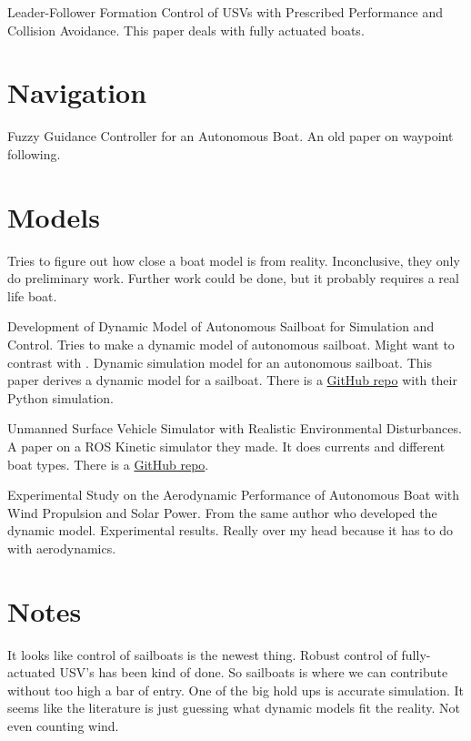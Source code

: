 \documentclass[conference]{IEEEtran}
\begin{document}
\cite{Dai2017} Leader-Follower Formation Control of USVs with Prescribed Performance and Collision Avoidance. This paper deals with fully actuated boats.


\section{Navigation}
\cite{Vaneck1997} Fuzzy Guidance Controller for an Autonomous Boat. An old paper on waypoint following.


\section{Models}
\cite{Huang2017} Tries to figure out how close a boat model is from reality. Inconclusive, they only do preliminary work. Further work could be done, but it probably requires a real life boat.

\cite{Setiawan2020} Development of Dynamic Model of Autonomous Sailboat for Simulation and Control. Tries to make a dynamic model of autonomous sailboat. Might want to contrast with \cite{Buehler2018}.
\cite{Buehler2018} Dynamic simulation model for an autonomous sailboat. This paper derives a dynamic model for a sailboat. There is a \href{https://github.com/simonkohaut/stda-sailboat-simulator/tree/master/src}{GitHub repo} with their Python simulation.

\cite{Paravisi2019} Unmanned Surface Vehicle Simulator with Realistic Environmental Disturbances. A paper on a ROS Kinetic simulator they made. It does currents and different boat types. There is a \href{https://github.com/disaster-robotics-proalertas/usv_sim_lsa}{GitHub repo}.

\cite{Setiawan2020} Experimental Study on the Aerodynamic Performance of Autonomous Boat with Wind Propulsion and Solar Power. From the same author who developed the dynamic model. Experimental results. Really over my head because it has to do with aerodynamics.

\section{Notes}
It looks like control of sailboats is the newest thing. Robust control of fully-actuated USV's has been kind of done. So sailboats is where we can contribute without too high a bar of entry. One of the big hold ups is accurate simulation. It seems like the literature is just guessing what dynamic models fit the reality. Not even counting wind.


\end{document}
